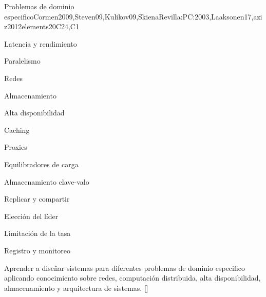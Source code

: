 \begin{syllabus}
  \begin{unit}{Problemas de dominio especifico}{}{Cormen2009,Steven09,Kulikov09,SkienaRevilla:PC:2003,Laaksonen17,aziz2012elements}{20}{C24,C1}
    \begin{topics}
      \item Latencia y rendimiento
      \item Paralelismo
      \item Redes
      \item Almacenamiento
      \item Alta disponibilidad
      \item Caching
      \item Proxies
      \item Equilibradores de carga
      \item Almacenamiento clave-valo
      \item Replicar y compartir
      \item Elección del líder
      \item Limitación de la tasa
      \item Registro y monitoreo
    \end{topics}
    \begin{learningoutcomes}
        \item Aprender a diseñar sistemas para diferentes problemas de dominio especifico aplicando conocimiento sobre redes, computación distribuida, alta disponibilidad, almacenamiento y arquitectura de sistemas. [\Usage]
    \end{learningoutcomes}
  \end{unit}
  
  \begin{coursebibliography}
  \end{coursebibliography}
  
  \end{syllabus}
  